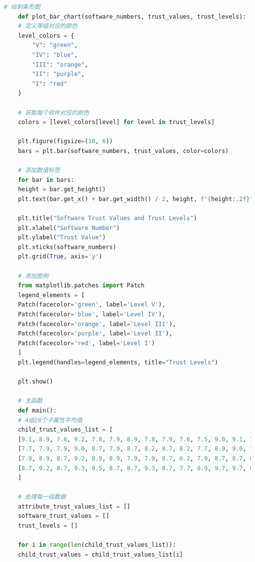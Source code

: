 \documentclass{article}
\begin{document}
\begin{lstlisting}[language=Python]
	# 绘制条形图
	def plot_bar_chart(software_numbers, trust_values, trust_levels):
	# 定义等级对应的颜色
	level_colors = {
		"V": "green",
		"IV": "blue",
		"III": "orange",
		"II": "purple",
		"I": "red"
	}
	
	# 获取每个软件对应的颜色
	colors = [level_colors[level] for level in trust_levels]
	
	plt.figure(figsize=(10, 6))
	bars = plt.bar(software_numbers, trust_values, color=colors)
	
	# 添加数值标签
	for bar in bars:
	height = bar.get_height()
	plt.text(bar.get_x() + bar.get_width() / 2, height, f"{height:.2f}", ha='center', va='bottom')
	
	plt.title("Software Trust Values and Trust Levels")
	plt.xlabel("Software Number")
	plt.ylabel("Trust Value")
	plt.xticks(software_numbers)
	plt.grid(True, axis='y')
	
	# 添加图例
	from matplotlib.patches import Patch
	legend_elements = [
	Patch(facecolor='green', label='Level V'),
	Patch(facecolor='blue', label='Level IV'),
	Patch(facecolor='orange', label='Level III'),
	Patch(facecolor='purple', label='Level II'),
	Patch(facecolor='red', label='Level I')
	]
	plt.legend(handles=legend_elements, title="Trust Levels")
	
	plt.show()
	
	# 主函数
	def main():
	# 4组28个子属性平均值
	child_trust_values_list = [
	[9.1, 8.9, 7.6, 9.2, 7.8, 7.9, 8.9, 7.8, 7.9, 7.6, 7.5, 9.0, 9.1, 7.6, 8.9, 9.0, 7.9, 7.6, 9.2, 8.7, 8.9, 8.9, 9.0, 9.1, 9.4, 10, 10, 9.0],
	[7.7, 7.9, 7.9, 9.0, 8.7, 7.9, 8.7, 8.2, 8.7, 8.2, 7.7, 8.9, 9.0, 7.7, 8.7, 8.7, 7.9, 8.7, 9.0, 7.8, 7.9, 8.9, 8.9, 9.2, 8.2, 8.9, 7.9, 10],
	[7.9, 8.9, 8.7, 9.2, 8.9, 8.9, 7.9, 7.9, 8.7, 6.2, 7.9, 8.7, 8.7, 8.7, 7.8, 7.8, 8.9, 8.9, 9.2, 7.9, 8.7, 8.7, 7.8, 7.7, 7.6, 9.3, 9.2, 8.9],
	[8.7, 9.2, 8.7, 9.3, 9.5, 8.7, 8.7, 9.3, 8.7, 7.7, 8.9, 9.7, 9.7, 8.7, 7.9, 8.7, 8.9, 9.2, 9.4, 8.7, 8.9, 9.4, 8.7, 8.7, 9.3, 9.5, 9.6, 8.9]
	]
	
	# 处理每一组数据
	attribute_trust_values_list = []
	software_trust_values = []
	trust_levels = []
	
	for i in range(len(child_trust_values_list)):
	child_trust_values = child_trust_values_list[i]
	

\end{lstlisting}
\end{document}
